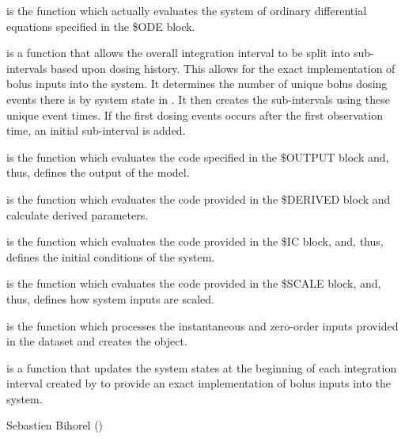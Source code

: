 \begin{Details}\relax
{} is the function which actually evaluates the system of
ordinary differential equations specified in the \$ODE block.

 is a function that allows the overall integration 
interval to be split into sub-intervals based upon dosing history.
This allows for the exact implementation of bolus inputs into the system. It
determines the number of unique bolus dosing events there is by system state 
in . It then creates the sub-intervals using these unique event 
times. If the first dosing events occurs after the first observation time, an 
initial sub-interval is added.

 is the function which evaluates the code specified in the 
\$OUTPUT block and, thus, defines the output of the model.

 is the function which evaluates the code provided in the
\$DERIVED block and calculate derived parameters.

 is the function which evaluates the code provided in the \$IC
block, and, thus, defines the initial conditions of the system.

 is the function which evaluates the code provided in the
\$SCALE block, and, thus, defines how system inputs are scaled.

 is the function which processes the instantaneous and 
zero-order inputs provided in the dataset and creates the  
object.

 is a function that updates the system states at the 
beginning of each integration interval created by  to 
provide an exact implementation of bolus inputs into the system.
\end{Details}
%
\begin{Author}\relax
Sebastien Bihorel ()
\end{Author}
%
\begin{SeeAlso}\relax
{}
\end{SeeAlso}
